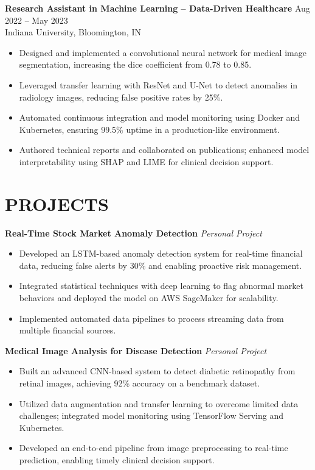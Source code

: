 \documentclass[12pt,a4paper]{article}
\begin{document}
\textbf{Research Assistant in Machine Learning -- Data-Driven Healthcare} \hfill Aug 2022 -- May 2023\\
Indiana University, Bloomington, IN
\begin{itemize}[leftmargin=*,noitemsep,topsep=0pt]
  \item Designed and implemented a convolutional neural network for medical image segmentation, increasing the dice coefficient from 0.78 to 0.85.
  \item Leveraged transfer learning with ResNet and U-Net to detect anomalies in radiology images, reducing false positive rates by 25\%.
  \item Automated continuous integration and model monitoring using Docker and Kubernetes, ensuring 99.5\% uptime in a production-like environment.
  \item Authored technical reports and collaborated on publications; enhanced model interpretability using SHAP and LIME for clinical decision support.
\end{itemize}

\section*{PROJECTS}

\textbf{Real-Time Stock Market Anomaly Detection} \hfill \textit{Personal Project}\\
\begin{itemize}[leftmargin=*,noitemsep,topsep=0pt]
  \item Developed an LSTM-based anomaly detection system for real-time financial data, reducing false alerts by 30\% and enabling proactive risk management.
  \item Integrated statistical techniques with deep learning to flag abnormal market behaviors and deployed the model on AWS SageMaker for scalability.
  \item Implemented automated data pipelines to process streaming data from multiple financial sources.
\end{itemize}

\textbf{Medical Image Analysis for Disease Detection} \hfill \textit{Personal Project}\\
\begin{itemize}[leftmargin=*,noitemsep,topsep=0pt]
  \item Built an advanced CNN-based system to detect diabetic retinopathy from retinal images, achieving 92\% accuracy on a benchmark dataset.
  \item Utilized data augmentation and transfer learning to overcome limited data challenges; integrated model monitoring using TensorFlow Serving and Kubernetes.
  \item Developed an end-to-end pipeline from image preprocessing to real-time prediction, enabling timely clinical decision support.
\end{itemize}
\end{document}
